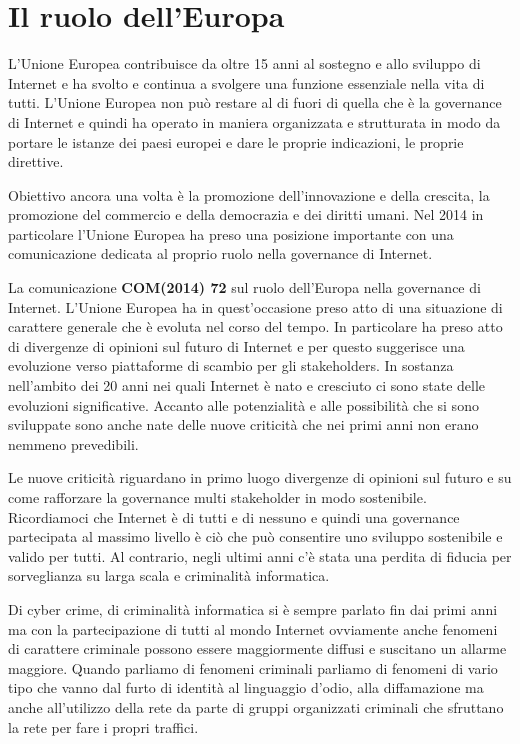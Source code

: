  \section{Il ruolo dell'Europa} 
 L'Unione Europea contribuisce da oltre 15 anni al sostegno e allo sviluppo di Internet e ha svolto e continua a svolgere una funzione essenziale nella vita di tutti. L'Unione Europea non può restare al di fuori di quella che è la governance di Internet e quindi ha operato in maniera organizzata e strutturata in modo da portare le istanze dei paesi europei e dare le proprie indicazioni, le proprie direttive. \par
 Obiettivo ancora una volta è la promozione dell'innovazione e della crescita, la promozione del commercio e della democrazia e dei diritti umani. Nel 2014 in particolare l'Unione Europea ha preso una posizione importante con una comunicazione dedicata al proprio ruolo nella governance di Internet. \par
 La comunicazione \textbf{COM(2014) 72} sul ruolo dell'Europa nella governance di Internet. L'Unione Europea ha in quest'occasione preso atto di una situazione di carattere generale che è evoluta nel corso del tempo. In particolare ha preso atto di divergenze di opinioni sul futuro di Internet e per questo suggerisce una evoluzione verso piattaforme di scambio per gli stakeholders. In sostanza nell'ambito dei 20 anni nei quali Internet è nato e cresciuto ci sono state delle evoluzioni significative. Accanto alle potenzialità e alle possibilità che si sono sviluppate sono anche nate delle nuove criticità che nei primi anni non erano nemmeno prevedibili.\par 
 Le nuove  criticità riguardano in primo luogo divergenze di opinioni sul futuro e su come rafforzare la governance multi stakeholder in modo sostenibile. Ricordiamoci che Internet è di tutti e di nessuno e quindi una governance partecipata al massimo livello è ciò che può consentire uno sviluppo sostenibile e valido per tutti. Al contrario,  negli ultimi anni c'è stata una perdita di fiducia per sorveglianza su larga scala e criminalità informatica. \par
 Di cyber crime, di criminalità informatica si è sempre parlato fin dai primi anni ma con la partecipazione di tutti al mondo Internet ovviamente anche fenomeni di carattere criminale possono essere maggiormente diffusi e  suscitano un allarme maggiore. Quando parliamo di fenomeni criminali parliamo di fenomeni di vario tipo che vanno dal furto di identità al linguaggio d'odio, alla diffamazione ma anche all'utilizzo della rete da parte di gruppi organizzati criminali che sfruttano la rete per fare i propri traffici.\par
